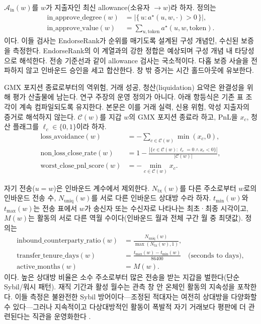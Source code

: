 
$\mathcal{A}_{\mathrm{in}}(w)$를 $w$가 지출자인 최신 allowance(소유자 $\to w$)라 하자. 정의는
\begin{align}
\mathrm{in\_approve\_degree}(w)
&=
\bigl|\{\,u : a^{\star}(u,w,\cdot)>0\,\}\bigr|,
\label{eq:in-approve-degree}\\
\mathrm{in\_approve\_value}(w)
&=
\sum_{u,\mathrm{token}} a^{\star}(u,w,\mathrm{token}).
\label{eq:in-approve-value}
\end{align}
이다. 이들 검사는 EndorseRank가 순위를 매기도록 설계된 구성 개념인, 수신된 보증을 측정한다. EndorseRank의 이 계열과의 강한 정합은 예상되며 구성 개념 내 타당성으로 해석한다. 전송 기준선과 같이 allowance 검사는 국소적이다. 다홉 보증 사슬을 전파하지 않고 인바운드 승인을 세고 합산한다. 창 밖 증거는 시간 홀드아웃에 유보한다.


GMX 포지션 종료로부터의 역위험, 거래 성공, 청산(liquidation) 요약은 완결성을 위해 평가 산출물에 남는다. 연구 주장의 운영 정의가 아니다. 아래 항등식은 기존 표 조각이 계속 컴파일되도록 유지한다. 본문은 이를 거래 실력, 신용 위험, 악성 지출자의 증거로 해석하지 않는다. $\mathcal{C}(w)$를 지갑 $w$의 GMX 포지션 종료라 하고, PnL을 $x_c$, 청산 플래그를 $\ell_c\in\{0,1\}$이라 하자.
\begin{align}
\mathrm{loss\_avoidance}(w)
&=
-\sum_{c\in\mathcal{C}(w)} \min(x_c,0),
\label{eq:loss-avoidance}\\
\mathrm{non\_loss\_close\_rate}(w)
&=
1-\frac{|\{c\in\mathcal{C}(w):\ell_c=0\land x_c<0\}|}{|\mathcal{C}(w)|},
\label{eq:non-loss-rate}\\
\mathrm{worst\_close\_pnl\_score}(w)
&=
-\min_{c\in\mathcal{C}(w)} x_c.
\label{eq:worst-close}
\end{align}


자기 전송($u=w$)은 인바운드 계수에서 제외한다. $N_{\mathrm{tx}}(w)$를 다른 주소로부터 $w$로의 인바운드 전송 수, $N_{\mathrm{uniq}}(w)$를 서로 다른 인바운드 상대방 수라 하자. $t_{\min}(w)$와 $t_{\max}(w)$는 전송 표에서 $w$가 송신자 또는 수신자로 나타나는 최초·최종 시각이고, $M(w)$는 활동의 서로 다른 역월 수이다(인바운드 월과 전체 구간 월 중 최댓값). 정의는
\begin{align}
\mathrm{inbound\_counterparty\_ratio}(w)
&=
\frac{N_{\mathrm{uniq}}(w)}{\max(N_{\mathrm{tx}}(w),1)},
\label{eq:counterparty-ratio}\\
\mathrm{transfer\_tenure\_days}(w)
&=
\frac{t_{\max}(w)-t_{\min}(w)}{86400}\quad\text{(seconds to days)},
\label{eq:tenure}\\
\mathrm{active\_months}(w)
&=
M(w).
\label{eq:active-months}
\end{align}
이다. 높은 상대방 비율은 소수 주소로부터 많은 전송을 받는 지갑을 벌한다(단순 Sybil/워시 패턴). 재직 기간과 활성 월수는 관측 창 안 온체인 활동의 지속성을 포착한다. 이들 측정은 불완전한 Sybil 방어이다---조정된 적대자는 여전히 상대방을 다양화할 수 있다---그러나 지속적이고 다상대방적인 활동이 폭발적 자기 거래보다 평판에 더 관련된다는 직관을 운영화한다 .

